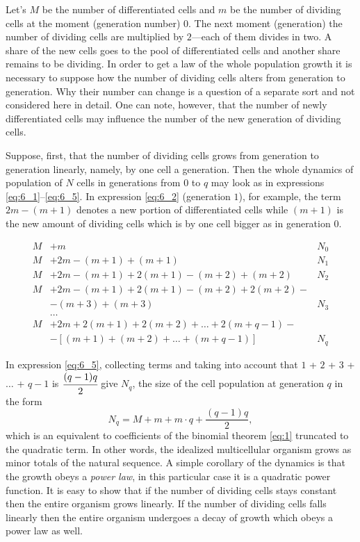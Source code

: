 \documentclass[12pt, twoside, leqno]{article}
\theoremstyle{definition}
\numberwithin{equation}{section}
\begin{document}
Let's $M$ be the number of differentiated cells and $m$ be the number of dividing cells at the moment (generation number) $0$. The next moment (generation) the number of dividing cells are multiplied by $2$---each of them divides in two. A share of the new cells goes to the pool of differentiated cells and another share remains to be dividing. In order to get a law of the whole population growth it is necessary to suppose how the number of dividing cells alters from generation to generation. Why their number can change is a question of a separate sort and not considered here in detail. One can note, however, that the number of newly differentiated cells may influence the number of the new generation of dividing cells.

Suppose, first, that the number of dividing cells grows from generation to generation linearly, namely, by one cell a generation. Then the whole dynamics of population of $N$ cells in generations from $0$ to $q$ may look as in expressions \ref{eq:6_1}--\ref{eq:6_5}. In expression \ref{eq:6_2} (generation $1$), for example, the term $2m - (m + 1)$ denotes a new portion of differentiated cells while $(m + 1)$ is the new amount of dividing cells which is by one cell bigger as in generation $0$.

\begin{align}
M &+ m &N_0\label{eq:6_1} \\
M &+ 2m - (m + 1) + (m + 1) &N_1 \label{eq:6_2} \\
M &+ 2m - (m + 1) + 2(m + 1) - (m + 2) + (m + 2) &N_2 \label{eq:6_3} \\
M &+ 2m - (m + 1) + 2(m + 1) - (m + 2) + 2(m + 2) - & \label{eq:6_4} \\
& - (m + 3) + (m + 3) &N_3 \nonumber \\
&\dots & \nonumber \\
M &+ 2m + 2(m + 1) + 2(m + 2) + \dots + 2(m + q - 1) - &\label{eq:6_5} \\
& - [(m + 1) + (m + 2) + \dots + (m + q - 1)] &N_q \nonumber
\end{align}

In expression \ref{eq:6_5}, collecting terms and taking into account that $1$ + $2$ + $3$ + $\dots$ + $q - 1$ is $\cfrac{(q - 1)q}{2}$ give $N_q$, the size of the cell population at generation $q$ in the form
\begin{equation}
N_q = M + m + m\cdot q + \frac{(q -1)q}{2},
\label{eq:7}
\end{equation}
which is an equivalent to coefficients of the binomial theorem \ref{eq:1} truncated to the quadratic term. In other words, the idealized multicellular organism grows as minor totals of the natural sequence. A simple corollary of the dynamics is that the growth obeys a \textit{power law}, in this particular case it is a quadratic power function. It is easy to show that if the number of dividing cells stays constant then the entire organism grows linearly. If the number of dividing cells falls linearly then the entire organism undergoes a decay of growth which obeys a power law as well.
\end{document}
